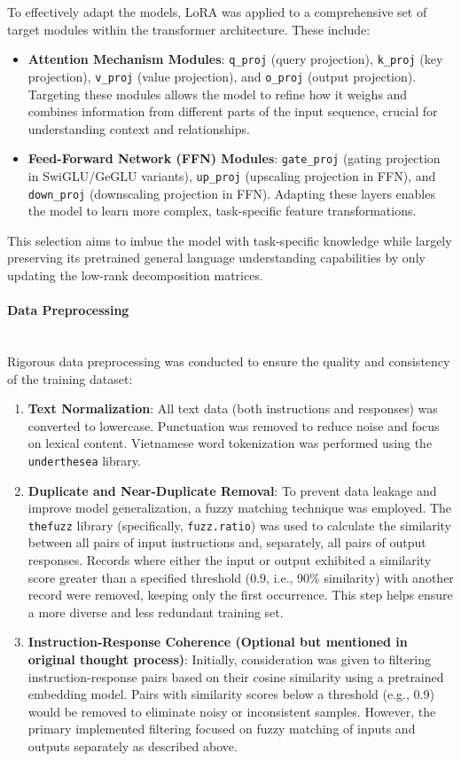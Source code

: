 \documentclass[runningheads]{llncs}
\begin{document}
To effectively adapt the models, LoRA was applied to a comprehensive set of target modules within the transformer architecture. These include:
\begin{itemize}
    \item \textbf{Attention Mechanism Modules}: \texttt{q\_proj} (query projection), \texttt{k\_proj} (key projection), \texttt{v\_proj} (value projection), and \texttt{o\_proj} (output projection). Targeting these modules allows the model to refine how it weighs and combines information from different parts of the input sequence, crucial for understanding context and relationships.
    \item \textbf{Feed-Forward Network (FFN) Modules}: \texttt{gate\_proj} (gating projection in SwiGLU/GeGLU variants), \texttt{up\_proj} (upscaling projection in FFN), and \texttt{down\_proj} (downscaling projection in FFN). Adapting these layers enables the model to learn more complex, task-specific feature transformations.
\end{itemize}
This selection aims to imbue the model with task-specific knowledge while largely preserving its pretrained general language understanding capabilities by only updating the low-rank decomposition matrices.

\paragraph{Data Preprocessing}\mbox{}\\
Rigorous data preprocessing was conducted to ensure the quality and consistency of the training dataset:
\begin{enumerate}
    \item \textbf{Text Normalization}: All text data (both instructions and responses) was converted to lowercase. Punctuation was removed to reduce noise and focus on lexical content. Vietnamese word tokenization was performed using the \texttt{underthesea} library.
    \item \textbf{Duplicate and Near-Duplicate Removal}: To prevent data leakage and improve model generalization, a fuzzy matching technique was employed. The \texttt{thefuzz} library (specifically, \texttt{fuzz.ratio}) was used to calculate the similarity between all pairs of input instructions and, separately, all pairs of output responses. Records where either the input or output exhibited a similarity score greater than a specified threshold (0.9, i.e., 90\% similarity) with another record were removed, keeping only the first occurrence. This step helps ensure a more diverse and less redundant training set.
    \item \textbf{Instruction-Response Coherence (Optional but mentioned in original thought process)}: Initially, consideration was given to filtering instruction-response pairs based on their cosine similarity using a pretrained embedding model. Pairs with similarity scores below a threshold (e.g., 0.9) would be removed to eliminate noisy or inconsistent samples. However, the primary implemented filtering focused on fuzzy matching of inputs and outputs separately as described above.
\end{enumerate}
\end{document}
